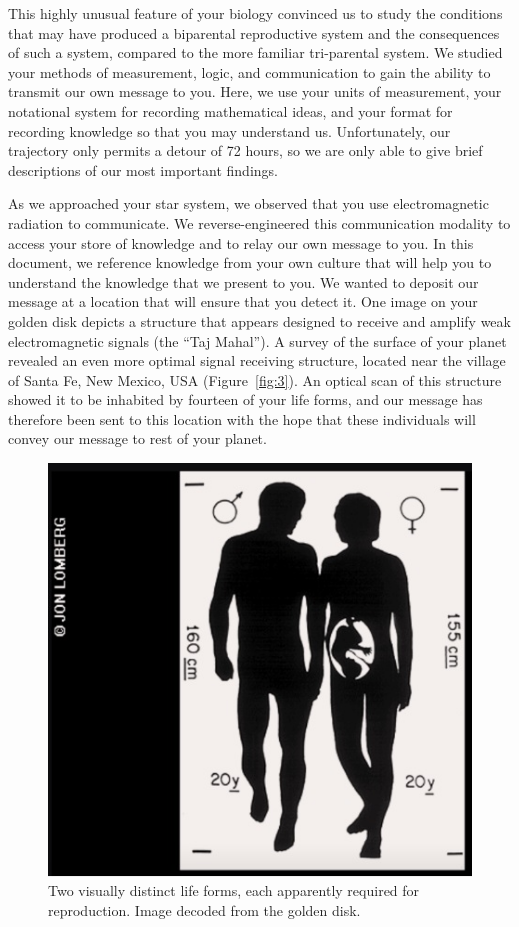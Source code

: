 This highly unusual feature of your biology convinced us to study the conditions that may have produced a biparental reproductive system and the consequences of such a system, compared to the more familiar tri-parental system. We studied your methods of measurement, logic, and communication to gain the ability to transmit our own message to you. Here, we use your units of measurement, your notational system for recording mathematical ideas, and your format for recording knowledge so that you may understand us. Unfortunately, our trajectory only permits a detour of 72 hours, so we are only able to give brief descriptions of our most important findings. 

As we approached your star system, we observed that you use electromagnetic radiation to communicate. We reverse-engineered this communication modality to access your store of knowledge and to relay our own message to you. In this document, we reference knowledge from your own culture that will help you to understand the knowledge that we present to you. We wanted to deposit our message at a location that will ensure that you detect it. One image on your golden disk depicts a structure that appears designed to receive and amplify weak electromagnetic signals (the ``Taj Mahal''). A survey of the surface of your planet revealed an even more optimal signal receiving structure, located near the village of Santa Fe, New Mexico, USA (Figure~\ref{fig:3}). An optical scan of this structure showed it to be inhabited by fourteen of your life forms, and our message has therefore been sent to this location with the hope that these individuals will convey our message to rest of your planet. 

\begin{figure}
\centering
\includegraphics[width=0.4\columnwidth]{parents_voyager.jpg}
\caption{Two visually distinct life forms, each apparently required for reproduction. Image decoded from the golden disk.
\label{fig:1}}
\end{figure}

